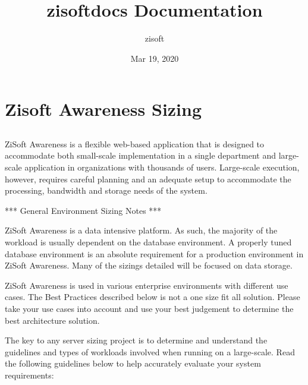 \documentclass[letterpaper,10pt,english]{sphinxmanual}
\title{zisoftdocs Documentation}
\date{Mar 19, 2020}
\author{zisoft}
\begin{document}
\pagestyle{empty}
\sphinxmaketitle
\pagestyle{plain}
\sphinxtableofcontents
\pagestyle{normal}
\label{\detokenize{index::doc}}



\chapter{Zisoft Awareness Sizing}
\label{\detokenize{index:zisoft-awareness-sizing}}

\section{}
\label{\detokenize{sizing:zisoft-awareness-hw-sizing}}\label{\detokenize{sizing::doc}}
ZiSoft Awareness is a flexible web-based application that is designed to accommodate both small-scale implementation in a single department and large-scale application in organizations with thousands of users. Large-scale execution, however, requires careful planning and an adequate setup to accommodate the processing, bandwidth and storage needs of the system.

*** General Environment Sizing Notes ***

ZiSoft Awareness is a data intensive platform. As such, the majority of the workload is usually dependent on the database environment. A properly tuned database environment is an absolute requirement for a production environment in ZiSoft Awareness. Many of the sizings detailed will be focused on data storage.

ZiSoft Awareness is used in various enterprise environments with different use cases. The Best Practices described below is not a one size fit all solution. Please take your use cases into account and use your best judgement to determine the best architecture solution.


The key to any server sizing project is to determine and understand the guidelines and types of workloads involved when running on a large-scale. Read the following guidelines below to help accurately evaluate your system requirements:
\end{document}
